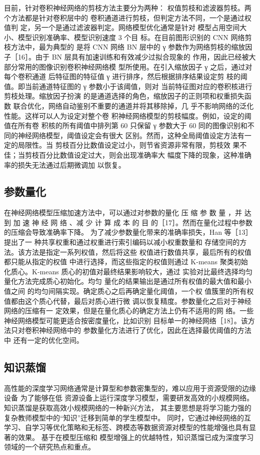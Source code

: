 目前，针对卷积神经网络的剪枝方法主要分为两种：
权值剪枝和滤波器剪枝。两个方法都是针对卷积层中的
卷积通道进行剪枝，但判定方法不同，一个是通过权值判
定，另一个是通过滤波器判定。网络模型优化通常是针对
模型占用空间大小、模型识别准确率、模型识别速度 3 个目
标。在目前图形识别的 CNN 网络剪枝方法中，最为典型的
是将 CNN 网络 BN 层中的 γ 参数作为网络剪枝的缩放因
子［16］。由于 BN 层具有加速训练和有效减少过拟合现象的
作用，因此已经被大部分常用的图像识别卷积神经网络模
型所使用。在引入缩放因子 γ 之后，通过对每个卷积通道
后特征图的特征值 γ 进行排序，然后根据排序结果设定剪
枝的阈值。即当前通道特征图的 γ 参数小于该阈值，则对
当前特征图对应的卷积核进行剪枝处理。缩放因子扮演
的是通道选择的角色，缩放因子的正则项和权重损失函数
联合优化，网络自动鉴别不重要的通道并将其移除掉，几
乎不影响网络的泛化性能。这样可以人为设定对整个卷
积神经网络模型的剪枝幅度。例如，设定的阈值在所有卷
积核的所有阈值中排列第 60%
只保留 γ 参数大于 60%
同的图像识别和不同的神经网络模型，阈值设定会有很大
区别。然而，这种全局阈值设定方法有一定的局限性。当
剪枝百分比数值设定过小，则节省资源非常有限，剪枝效
果不佳；当剪枝百分比数值设定过大，则会出现准确率大
幅度下降的现象，这种准确率的损失无法通过后期微调加
以恢复。

\subsection{参数量化}
在神经网络模型压缩加速方法中，可以通过对参数的量化
压 缩 参 数 量 ，并 达 到 加 速 神 经 网 络 、减 少 计 算 成 本 的 目
的［17］。然而在量化过程中参数的压缩会导致准确率下降。
为了减少参数量化带来的准确率损失，Han 等［13］提出了一
种共享权重和通过权重进行索引编码以减小权重数量和
存储空间的方法。该方法是指定一系列权值，然后将这些
权值进行数值共享，最后所有的权值都只能从指定的权值
中进行选择，而这些指定的权值则通过 K-means 聚类初始
化质心。K-means 质心的初值对最终结果影响较大，通过
实验对比最终选择均匀量化方法完成质心初始化。均匀
量化的结果输出是通过所有权值的最大值和最小值之间
的均匀间隔实现。确定质心之后再确定量化阈值，一个权
值簇里的所有权值都由这个质心代替，最后对质心进行微
调以恢复精度。参数量化之后对于神经网络的压缩有一
定效果，但是在量化质心的确定方法上仍有不适用的网
络。一些神经网络模型可能更适合按密度量化，比如识别
目标单一的神经网络［18］。该方法只对卷积神经网络中的
参数量化方法进行了优化，因此在选择最优阈值的方法中
还有一定的优化空间。

\subsection{知识蒸馏}
高性能的深度学习网络通常是计算型和参数密集型的，难以应用于资源受限的边缘设备  为了能够在低
资源设备上运行深度学习模型，需要研发高效的小规模网络。  知识蒸馏是获取高效小规模网络的一种新兴方法，
其主要思想是将学习能力强的复杂教师模型中的“知识”迁移到简单的学生模型中。  同时，它通过神经网络的互
学习、自学习等优化策略和无标签、跨模态等数据资源对模型的性能增强也具有显著的效果。  基于在模型压缩和
模型增强上的优越特性，知识蒸馏已成为深度学习领域的一个研究热点和重点。 

